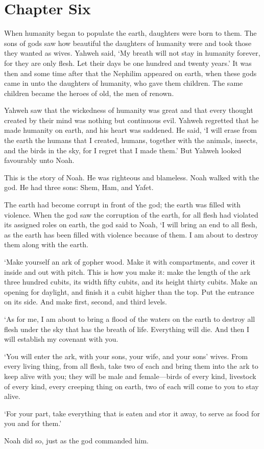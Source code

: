 \chapter*{Chapter Six}

When humanity began to populate the earth,
daughters were born to them.
The sons of gods saw how beautiful
the daughters of humanity were 
and took those they wanted as wives.
Yahweh said, `My breath will not stay in humanity forever,
for they are only flesh.
Let their days be one hundred and twenty years.'
It was then and some time after
that the Nephilim appeared on earth,
when these gods came in unto the daughters of humanity,
who gave them children.
The same children became the heroes of old,
the men of renown.

Yahweh saw that the wickedness
of humanity was great
and that every thought created by their mind
was nothing but continuous evil.
Yahweh regretted that he made humanity on earth,
and his heart was saddened.
He said, `I will erase from the earth 
the humans that I created,
humans, together with the animals, insects, and the birds in the sky,
for I regret that I made them.'
But Yahweh looked favourably unto Noah.

\secsep

\noindent This is the story of Noah. 
He was righteous and blameless.
Noah walked with the god. 
He had three sons: Shem, Ham, and Yafet.

The earth had become corrupt in front of the god;
the earth was filled with violence.
When the god saw the corruption of the earth,
for all flesh had violated its assigned roles on earth,
the god said to Noah, `I will bring an end to all flesh,
as the earth has been filled with violence because of them.
I am about to destroy them along with the earth.

`Make yourself an ark of gopher wood.
Make it with compartments, 
and cover it inside and out with pitch.
This is how you make it:
make the length of the ark three hundred cubits,
its width fifty cubits, 
and its height thirty cubits.
Make an opening for daylight, 
and finish it a cubit higher than the top.
Put the entrance on its side.
And make first, second, and third levels.

`As for me,
I am about to bring a flood of the waters on the earth 
to destroy all flesh under the sky that has the breath of life.
Everything will die.
And then I will establish my covenant with you.

`You will enter the ark, 
with your sons,
your wife,
and your sons' wives. 
From every living thing,
from all flesh,
take two of each and bring them into the ark 
to keep alive with you;
they will be male and female---birds of every kind,
livestock of every kind,
every creeping thing on earth,
two of each will come to you to stay alive.

`For your part,
take everything that is eaten and stor it away,
to serve as food for you 
and for them.'

Noah did so, just as the god commanded him.